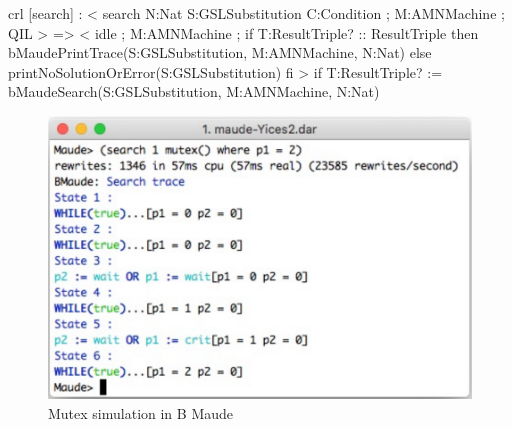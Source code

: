\documentclass[a4paper,openany]{book}
\makeatletter
\def\maxwidth{\ifdim\Gin@nat@width>\linewidth\linewidth
    \else\Gin@nat@width\fi}
\let\Oldincludegraphics\includegraphics
\renewcommand{\includegraphics}[1]{\Oldincludegraphics[width=.8\maxwidth]{#1}}
\makeatother
\begin{document}
\begin{maude}
crl [search] :
     < search N:Nat S:GSLSubstitution C:Condition ; M:AMNMachine ; QIL > =>
     < idle ; M:AMNMachine ;
             if T:ResultTriple? :: ResultTriple
             then
                bMaudePrintTrace(S:GSLSubstitution, M:AMNMachine, N:Nat) 	         
             else 
                printNoSolutionOrError(S:GSLSubstitution)
             fi >
if T:ResultTriple? := bMaudeSearch(S:GSLSubstitution, M:AMNMachine, N:Nat)
\end{maude}
\begin{figure}[ht]\centering
\includegraphics{mutex-simulation2}
\caption{Mutex simulation in B Maude}\label{fig:mutex-simulation}
\end{figure}

\end{document}
